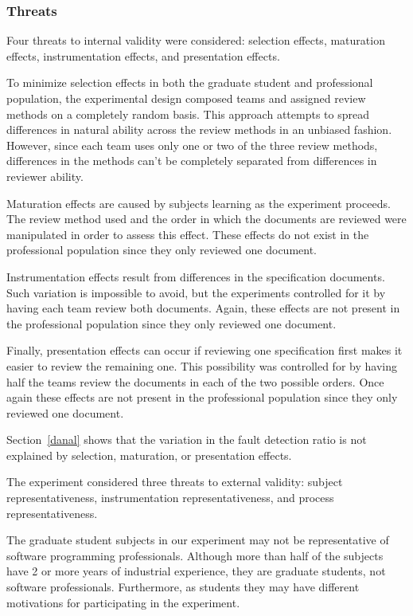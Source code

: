 \subsubsection{Threats}
\label{sec:teamselec}

Four threats to internal validity were considered:  
selection effects, maturation effects, instrumentation 
effects, and  presentation effects.

To minimize selection effects in both the graduate student and professional population,
the experimental design composed teams and assigned review methods on a completely 
random basis.  This approach attempts to spread differences in natural ability 
across the review methods in an unbiased fashion.  However, since each
team uses only one or two of the three review methods, differences in 
the methods can't be completely separated from differences in reviewer ability. 

Maturation effects are caused by subjects learning as the experiment proceeds. 
The review method used and the order in which the documents 
are reviewed were manipulated in order to assess this effect. 
These effects do not exist in the professional population since
they only reviewed one document.

Instrumentation effects result from differences in the specification documents.
Such variation is impossible to avoid, but the experiments controlled for it by having each team 
review both documents. Again, these effects are not present in the professional population
since they only reviewed one document.

Finally, presentation effects can occur if reviewing one specification first makes 
it easier to review the remaining one. This possibility was controlled for 
by having half the teams review the documents in each of the two possible orders. 
Once again these effects are not present in the professional population
since they only reviewed one document.

Section~\ref{danal} shows that the variation in the fault detection ratio is not explained by 
selection, maturation, or presentation effects.

The experiment considered three threats to external validity: subject representativeness, 
instrumentation representativeness, and process representativeness.

The graduate student subjects in our experiment may not be 
representative of software programming professionals. Although more
than half of the subjects have 2 or more years of industrial
experience, they are graduate students, not software professionals.
Furthermore, as students they may have different motivations for
participating in the experiment.

